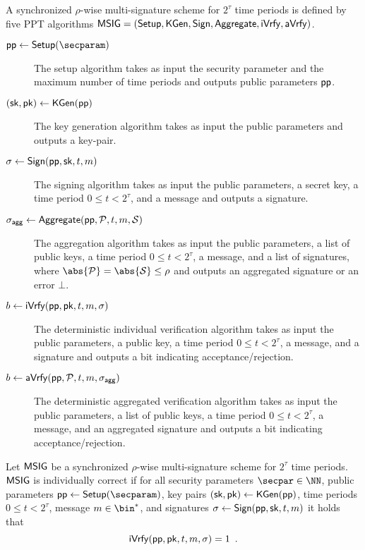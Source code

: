 \begin{definition}\label{def:multisig} A synchronized $\rho$-wise multi-signature scheme for $2^\tau$ time periods is defined by five PPT algorithms $\mathsf{MSIG}=(\mathsf{Setup}, \mathsf{KGen}, \mathsf{Sign},\allowbreak \mathsf{Aggregate},\allowbreak \mathsf{iVrfy}, \mathsf{aVrfy})$.
\begin{description}
  \item[$\params\gets\setup(\secparam)$] The setup algorithm takes as input the security parameter and the maximum number of time periods and outputs public parameters $\mathsf{pp}$. 
  \item[$(\mathsf{sk},\mathsf{pk})\gets\mathsf{KGen}(\mathsf{pp})$] The key generation algorithm takes as input the public parameters and outputs a key-pair.
  \item[$\sigma\gets\mathsf{Sign}(\mathsf{pp},\mathsf{sk},t,m)$] The signing algorithm takes as input the public parameters, a secret key, a time period $0 \leq t < 2^\tau $, and a message and outputs a signature.
  \item[$\sigma_\mathsf{agg}\gets\mathsf{Aggregate}(\mathsf{pp},\mathcal{P},t,m,\mathcal{S})$] The aggregation algorithm takes as input the public parameters, a list of public keys, a time period $0 \leq t < 2^\tau$, a message, and a list of signatures, where $\abs{\pubkeys}=\abs{\signatures}\leq\rho$ and outputs an aggregated signature or an error $\bot$.
  \item[$b \gets \mathsf{iVrfy}(\mathsf{pp},\mathsf{pk},t,m,\sigma)$] The deterministic individual verification algorithm takes as input the public parameters, a public key, a time period $0 \leq t < 2^\tau $, a message, and a signature and outputs a bit indicating acceptance/rejection.
  \item[$b \gets \mathsf{aVrfy}(\mathsf{pp},\mathcal{P},t,m,\sigma_\mathsf{agg})$] The deterministic aggregated verification algorithm takes as input the public parameters, a list of public keys, a time period $0 \leq t < 2^\tau$, a message, and an aggregated signature and outputs a bit indicating acceptance/rejection.
\end{description}
\end{definition}

\begin{definition}
  Let $\mathsf{MSIG}$ be a synchronized $\rho$-wise multi-signature scheme for $2^\tau$ time periods.
  $\mathsf{MSIG}$ is individually correct if for all security parameters $\secpar\in\NN$, public parameters $\params\gets\setup(\secparam)$, key pairs $(\mathsf{sk},\mathsf{pk})\gets\mathsf{KGen}(\mathsf{pp})$, time periods $0 \leq t < 2^\tau$, message $m\in\bin^*$, and signatures $\sigma\gets\mathsf{Sign}(\mathsf{pp},\mathsf{sk},t,m)$ it holds that
  \[
    \mathsf{iVrfy}(\mathsf{pp},\mathsf{pk},t,m,\sigma) = 1\enspace.
  \]
\end{definition}

